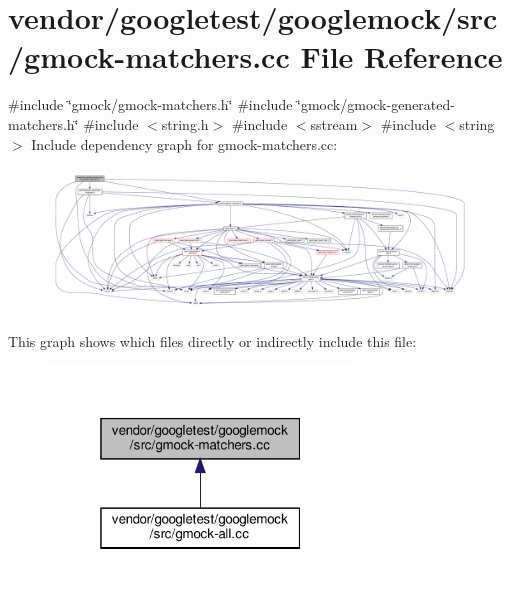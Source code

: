 \hypertarget{gmock-matchers_8cc}{}\section{vendor/googletest/googlemock/src/gmock-\/matchers.cc File Reference}
\label{gmock-matchers_8cc}
{\ttfamily \#include \char`\"{}gmock/gmock-\/matchers.\+h\char`\"{}}\newline
{\ttfamily \#include \char`\"{}gmock/gmock-\/generated-\/matchers.\+h\char`\"{}}\newline
{\ttfamily \#include $<$string.\+h$>$}\newline
{\ttfamily \#include $<$sstream$>$}\newline
{\ttfamily \#include $<$string$>$}\newline
Include dependency graph for gmock-\/matchers.cc\+:
\nopagebreak
\begin{figure}[H]
\begin{center}
\leavevmode
\includegraphics[width=350pt]{gmock-matchers_8cc__incl}
\end{center}
\end{figure}
This graph shows which files directly or indirectly include this file\+:
\nopagebreak
\begin{figure}[H]
\begin{center}
\leavevmode
\includegraphics[width=229pt]{gmock-matchers_8cc__dep__incl}
\end{center}
\end{figure}
